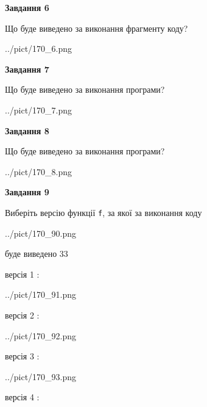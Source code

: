 \documentclass[12pt, ukrainian]{article}
\def\code#1{\Verb!#1!}
\begin{document}
{\begin {large}
{\begin {center}\textbf{Завдання 6}\end {center}}

Що буде виведено за виконання фрагменту коду?\par
\begin{center}
	{../pict/170_6.png}
\end{center}
\newpage

{\begin {center}\textbf{Завдання 7}\end {center}}

Що буде виведено за виконання програми?\par
\begin{center}
	{../pict/170_7.png}
\end{center}
\newpage

{\begin {center}\textbf{Завдання 8}\end {center}}

Що буде виведено за виконання програми?\par
\begin{center}
	{../pict/170_8.png}
\end{center}
\newpage

{\begin {center}\textbf{Завдання 9}\end {center}}

Виберіть версію функції \code{f}, за якої за виконання коду
\begin{center}
	{../pict/170_90.png}
\end{center}
буде виведено 33

\vspace{5mm}
версія 1 :

\begin{center}
	{../pict/170_91.png}
\end{center}
версія 2 :

\begin{center}
	{../pict/170_92.png}
\end{center}
версія 3 :

\begin{center}
	{../pict/170_93.png}
\end{center}
версія 4 :


\end{large}}
\end{document}
